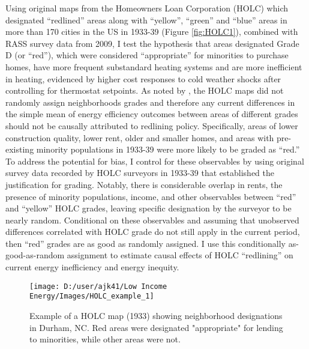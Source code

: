 \documentclass[
]{article}
\begin{document}
Using original maps from the Homeowners Loan Corporation (HOLC) which designated ``redlined'' areas along with ``yellow'', ``green'' and ``blue'' areas
in more than 170 cities in the US in 1933-39 (Figure \ref{fig:HOLC1}),
combined with RASS survey data from 2009, I test the hypothesis that areas designated Grade D (or ``red''), which were considered ``appropriate'' for minorities to purchase homes, have more frequent substandard heating systems and are more inefficient in heating, evidenced by higher cost responses to cold weather shocks after controlling
for thermostat setpoints. As noted by \citet{Fishback2020}, the HOLC maps did not randomly assign neighborhoods grades and therefore any current differences in
the simple mean of energy efficiency outcomes between areas of different grades should not be causally attributed to redlining policy. Specifically, areas of lower construction quality, lower rent, older and smaller homes, and areas with pre-existing minority populations in 1933-39 were more likely to be graded as ``red.'' To address
the potential for bias, I control for these observables by using original survey data recorded by HOLC surveyors in 1933-39 that established the
justification for grading. Notably, there is considerable overlap in rents, the presence of minority populations, income, and other observables between ``red'' and ``yellow''
HOLC grades, leaving specific designation by the surveyor to be nearly random. Conditional on these observables and assuming that
unobserved differences correlated with HOLC grade do not still apply in the current period, then
``red'' grades are as good as randomly assigned. I use this conditionally as-good-as-random assignment to estimate causal effects of HOLC ``redlining'' on current
energy inefficiency and energy inequity.

\begin{figure}

{\centering \texttt{[image: D:/user/ajk41/Low Income Energy/Images/HOLC\_example\_1]} 

}

\caption{Example of a HOLC map (1933) showing neighborhood designations in Durham, NC. Red areas were designated "appropriate" for lending to minorities, while other areas were not. \label{fig:HOLC1}}\label{fig:dispfig1}
\end{figure}
\end{document}
